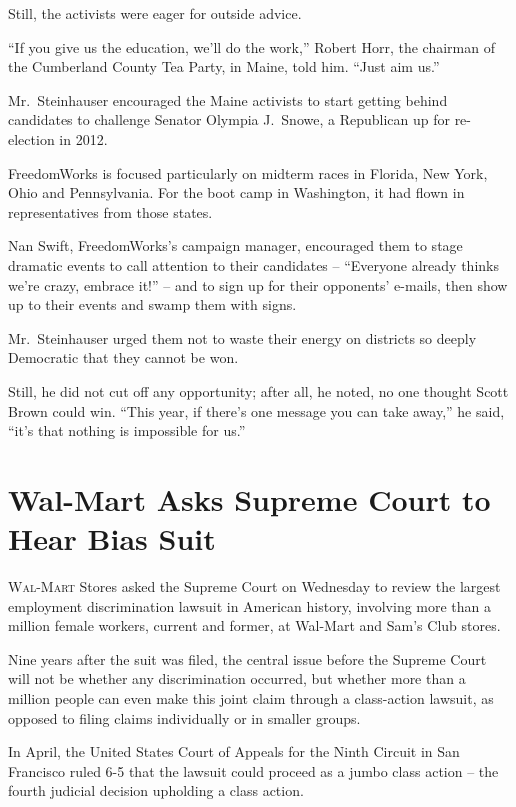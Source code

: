 ﻿\documentclass[12pt]{article}
\begin{document}
Still, the activists were eager for outside advice.

``If you give us the education, we'll do the work,'' Robert Horr, the chairman of the Cumberland
County Tea Party, in Maine, told him. ``Just aim us.''

Mr.~Steinhauser encouraged the Maine activists to start getting behind candidates to challenge
Senator Olympia J.~Snowe, a Republican up for re-election in 2012.

FreedomWorks is focused particularly on midterm races in Florida, New York, Ohio and Pennsylvania.
For the boot camp in Washington, it had flown in representatives from those states.

Nan Swift, FreedomWorks's campaign manager, encouraged them to stage dramatic events to call
attention to their candidates -- ``Everyone already thinks we're crazy, embrace it!'' -- and to sign
up for their opponents' e-mails, then show up to their events and swamp them with signs.

Mr.~Steinhauser urged them not to waste their energy on districts so deeply Democratic that they
cannot be won.

Still, he did not cut off any opportunity; after all, he noted, no one thought Scott Brown could
win. ``This year, if there's one message you can take away,'' he said, ``it's that nothing is
impossible for us.''

\pagebreak
\section{Wal-Mart Asks Supreme Court to Hear Bias Suit}

\lettrine{W}{al-Mart} Stores asked the Supreme Court on Wednesday to review
the largest employment discrimination lawsuit in American history, involving more than a million
female workers, current and former, at Wal-Mart and Sam's Club stores.

Nine years after the suit was filed, the central issue before the Supreme Court will not be whether
any discrimination occurred, but whether more than a million people can even make this joint claim
through a class-action lawsuit, as opposed to filing claims individually or in smaller groups.

In April, the United States Court of Appeals for the Ninth Circuit in San Francisco ruled 6-5 that
the lawsuit could proceed as a jumbo class action -- the fourth judicial decision upholding a class
action.
\end{document}
